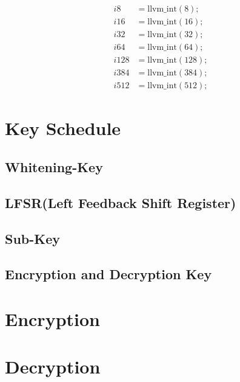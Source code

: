 \[
\begin{aligned}
	& i8 &= \text{llvm\_int}(8); \\
	& i16 &= \text{llvm\_int}(16); \\
	& i32 &= \text{llvm\_int}(32); \\
	& i64 &= \text{llvm\_int}(64); \\
	& i128 &= \text{llvm\_int}(128); \\
	& i384 &= \text{llvm\_int}(384); \\
	& i512 &= \text{llvm\_int}(512);
\end{aligned}
\]

\section{Key Schedule}
\subsection{Whitening-Key}
\subsection{LFSR(Left Feedback Shift Register)}
\subsection{Sub-Key}
\subsection{Encryption and Decryption Key}

\newpage
\section{Encryption}

\newpage
\section{Decryption}
